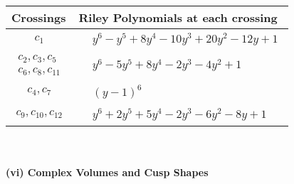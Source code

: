 \documentclass[1p]{elsarticle_modified}
\theoremstyle{definition}
\begin{document}
\begin{tabular}{m{50pt}|m{274pt}}
Crossings & \hspace{64pt}Riley Polynomials at each crossing \\
\hline $$\begin{aligned}c_{1}\end{aligned}$$&$\begin{aligned}
&y^6- y^5+8 y^4-10 y^3+20 y^2-12 y+1
\end{aligned}$\\
\hline $$\begin{aligned}c_{2},c_{3},c_{5}\\c_{6},c_{8},c_{11}\end{aligned}$$&$\begin{aligned}
&y^6-5 y^5+8 y^4-2 y^3-4 y^2+1
\end{aligned}$\\
\hline $$\begin{aligned}c_{4},c_{7}\end{aligned}$$&$\begin{aligned}
&(y-1)^6
\end{aligned}$\\
\hline $$\begin{aligned}c_{9},c_{10},c_{12}\end{aligned}$$&$\begin{aligned}
&y^6+2 y^5+5 y^4-2 y^3-6 y^2-8 y+1
\end{aligned}$\\
\hline
\end{tabular}\\~\\
\newpage\flushleft \textbf{(vi) Complex Volumes and Cusp Shapes}
\end{document}
